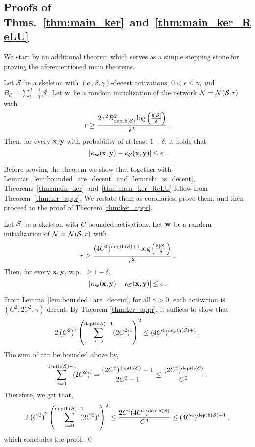 \subsection{Proofs of Thms.~\ref{thm:main_ker}~and~\ref{thm:main_ker_ReLU}}
We start by an additional theorem which serves as a simple stepping stone
for proving the aforementioned main theorems.
\begin{theorem}\label{thm:ker_appr}
%
Let ${\cal S}$ be a skeleton with $(\alpha,\beta,\gamma)$-decent
activations, $0<\epsilon \le \gamma$, and
$B_d = \sum_{i=0}^{d-1}\beta^i$. Let ${\mathbf w}$ be a random initialization of the
network ${\cal N}={\cal N}({\cal S},r)$ with
$$r \ge \frac{2\alpha^2B_{\mathrm{depth}({\cal S})}^2
	\log\left(\frac{8|{\cal S}|}{\delta}\right)} {\epsilon^2} \,. $$
Then, for every ${\mathbf x},{\mathbf y}$ with probability of at least $1-\delta$, it holds that
\[
|\kappa_{\mathbf w}({\mathbf x},{\mathbf y})-\kappa_{\cal S}({\mathbf x},{\mathbf y})|\le \epsilon \,.
\]
\end{theorem}
\noindent
Before proving the theorem we show that together with
Lemmas~\ref{lem:bounded_are_decent}~and~\ref{lem:relu_is_decent},
Theorems~\ref{thm:main_ker}~and~\ref{thm:main_ker_ReLU} follow from
Theorem~\ref{thm:ker_appr}. We restate them as corollaries, prove them,
and then proceed to the proof of Theorem \ref{thm:ker_appr}.
\begin{corollary}
Let ${\cal S}$ be a skeleton with $C$-bounded activations. Let ${\mathbf w}$ be a random
initialization of ${\cal N}={\cal N}({\cal S},r)$ with
$$r \ge \frac{(4C^4)^{\mathrm{depth}({\cal S})+1}
\log\left(\frac{8|{\cal S}|}{\delta}\right)}{\epsilon^2} \,.$$
Then, for every ${\mathbf x},{\mathbf y}$, w.p.\ $\ge 1-\delta$,
\[
|\kappa_{\mathbf w}({\mathbf x},{\mathbf y})-\kappa_{\cal S}({\mathbf x},{\mathbf y})|\le \epsilon\,.
\]
\end{corollary}
\proof
From Lemma~\ref{lem:bounded_are_decent}, for all $\gamma>0$, each
activation is $(C^2,2C^2,\gamma)$-decent. By Theorem
\ref{thm:ker_appr}, it suffices to show that
$$2\left(C^2\right)^2\left(\sum_{i=0}^{\mathrm{depth}({\cal S})-1}(2C^2)^{i}\right)^2
	\le (4C^4)^{\mathrm{depth}({\cal S})+1} \,. $$
The sum of can be bounded above by,
\[
\sum_{i=0}^{\mathrm{depth}({\cal S})-1}\!\!\!(2C^2)^{i} =
	\frac{(2C^2)^{\mathrm{depth}({\cal S})}-1}{2C^2-1} \le
	\frac{(2C^2)^{\mathrm{depth}({\cal S})}}{C^2} \,.
\]
Therefore, we get that,
\[
2\left(C^2\right)^2\left(\sum_{i=0}^{\mathrm{depth}({\cal S})-1}\!\!\!(2C^2)^{i}\right)^2
	\le \frac{2C^4(4C^4)^{\mathrm{depth}({\cal S})}}{C^4} \le (4C^4)^{\mathrm{depth}({\cal S})+1} \,,
\]
which concludes the proof. \qed

